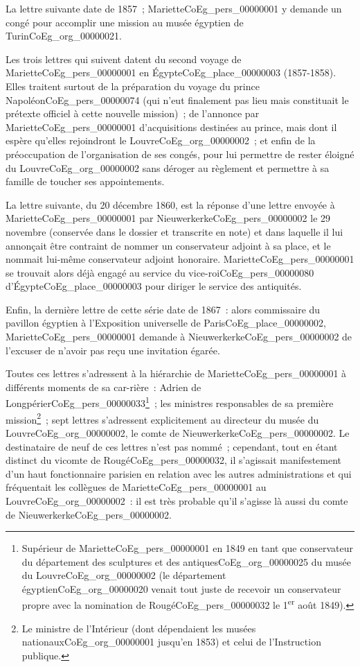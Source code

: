 \documentclass{book}
\begin{document}
\par La lettre suivante date de 1857~; Mariette\gls{CoEg_pers_00000001} y demande un congé pour accomplir une mission au musée égyptien de Turin\gls{CoEg_org_00000021}.
\par Les trois lettres qui suivent datent du second voyage de Mariette\gls{CoEg_pers_00000001} en Égypte\gls{CoEg_place_00000003} (1857-1858). Elles traitent surtout de la préparation du voyage du prince Napoléon\gls{CoEg_pers_00000074} (qui n’eut finalement pas lieu mais constituait le prétexte officiel à cette nouvelle mission)~; de l’annonce par Mariette\gls{CoEg_pers_00000001} d’acquisitions destinées au prince, mais dont il espère qu’elles rejoindront le Louvre\gls{CoEg_org_00000002}~; et enfin de la préoccupation de l’organisation de ses congés, pour lui permettre de rester éloigné du Louvre\gls{CoEg_org_00000002} sans déroger au règlement et permettre à sa famille de toucher ses appointements.
\par La lettre suivante, du 20 décembre 1860, est la réponse d’une lettre envoyée à Mariette\gls{CoEg_pers_00000001} par Nieuwerkerke\gls{CoEg_pers_00000002} le 29 novembre (conservée dans le dossier et transcrite en note) et dans laquelle il lui annonçait être contraint de nommer un conservateur adjoint à sa place, et le nommait lui-même conservateur adjoint honoraire. Mariette\gls{CoEg_pers_00000001} se trouvait alors déjà engagé au service du vice-roi\gls{CoEg_pers_00000080} d’Égypte\gls{CoEg_place_00000003} pour diriger le service des antiquités.
\par Enfin, la dernière lettre de cette série date de 1867~: alors commissaire du pavillon égyptien à l'Exposition universelle de Paris\gls{CoEg_place_00000002}, Mariette\gls{CoEg_pers_00000001} demande à Nieuwerkerke\gls{CoEg_pers_00000002} de l’excuser de n’avoir pas reçu une invitation égarée.
\par Toutes ces lettres s’adressent à la hiérarchie de Mariette\gls{CoEg_pers_00000001} à différents moments de sa car-rière~: Adrien de Longpérier\gls{CoEg_pers_00000033}\footnote{Supérieur de Mariette\gls{CoEg_pers_00000001} en 1849 en tant que conservateur du département des sculptures et des antiques\gls{CoEg_org_00000025} du musée du Louvre\gls{CoEg_org_00000002} (le département égyptien\gls{CoEg_org_00000020} venait tout juste de recevoir un conservateur propre avec la nomination de Rougé\gls{CoEg_pers_00000032} le 1\textsuperscript{er} août 1849).}~; les ministres responsables de sa première mission\footnote{Le ministre de l’Intérieur (dont dépendaient les musées nationaux\gls{CoEg_org_00000001} jusqu’en 1853) et celui de l’Instruction publique.}~; sept lettres s’adressent explicitement au directeur du musée du Louvre\gls{CoEg_org_00000002}, le comte de Nieuwerkerke\gls{CoEg_pers_00000002}. Le destinataire de neuf de ces lettres n’est pas nommé~; cependant, tout en étant distinct du vicomte de Rougé\gls{CoEg_pers_00000032}, il s’agissait manifestement d’un haut fonctionnaire parisien en relation avec les autres administrations et qui fréquentait les collègues de Mariette\gls{CoEg_pers_00000001} au Louvre\gls{CoEg_org_00000002}~: il est très probable qu’il s’agisse là aussi du comte de Nieuwerkerke\gls{CoEg_pers_00000002}.
\end{document}

